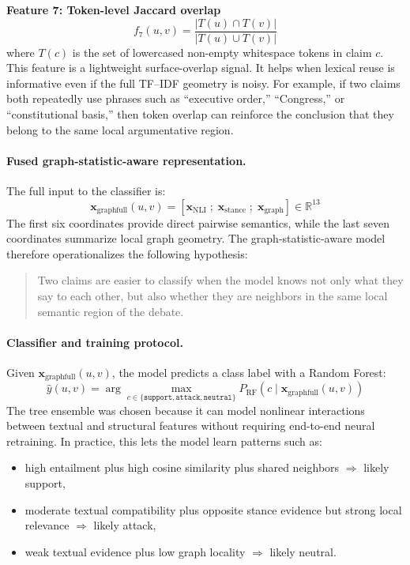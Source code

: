 \documentclass[11pt,a4paper]{article}
\begin{document}
\textbf{Feature 7: Token-level Jaccard overlap}
\begin{equation}
f_7(u,v) = \frac{|T(u) \cap T(v)|}{|T(u) \cup T(v)|}
\end{equation}
where \(T(c)\) is the set of lowercased non-empty whitespace tokens in claim \(c\). This feature is a lightweight
surface-overlap signal. It helps when lexical reuse is informative even if the full TF--IDF geometry is noisy. For
example, if two claims both repeatedly use phrases such as ``executive order,'' ``Congress,'' or ``constitutional
basis,'' then token overlap can reinforce the conclusion that they belong to the same local argumentative region.

\paragraph{Fused graph-statistic-aware representation.}
The full input to the classifier is:
\begin{equation}
\mathbf{x}_{\mathrm{graphfull}}(u,v) =
\left[
\mathbf{x}_{\mathrm{NLI}} \; ; \; \mathbf{x}_{\mathrm{stance}} \; ; \; \mathbf{x}_{\mathrm{graph}}
\right]
\in \mathbb{R}^{13}
\end{equation}
The first six coordinates provide direct pairwise semantics, while the last seven coordinates summarize local graph
geometry. The graph-statistic-aware model therefore operationalizes the following hypothesis:
\begin{quote}
Two claims are easier to classify when the model knows not only what they say to each other, but also whether they are
neighbors in the same local semantic region of the debate.
\end{quote}

\paragraph{Classifier and training protocol.}
Given \(\mathbf{x}_{\mathrm{graphfull}}(u,v)\), the model predicts a class label with a Random Forest:
\begin{equation}
\hat{y}(u,v) = \arg\max_{c \in \{\texttt{support},\texttt{attack},\texttt{neutral}\}} P_{\mathrm{RF}}\!\left(c \mid \mathbf{x}_{\mathrm{graphfull}}(u,v)\right)
\end{equation}
The tree ensemble was chosen because it can model nonlinear interactions between textual and structural features
without requiring end-to-end neural retraining. In practice, this lets the model learn patterns such as:
\begin{itemize}[leftmargin=1.5em]
  \item high entailment plus high cosine similarity plus shared neighbors \(\Rightarrow\) likely support,
  \item moderate textual compatibility plus opposite stance evidence but strong local relevance \(\Rightarrow\) likely attack,
  \item weak textual evidence plus low graph locality \(\Rightarrow\) likely neutral.
\end{itemize}
\end{document}
